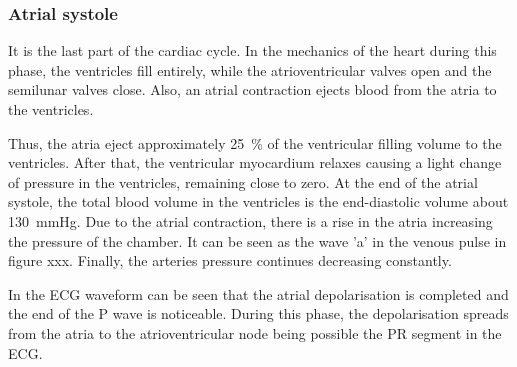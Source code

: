 \subsubsection{Atrial systole}
It is the last part of the cardiac cycle. In the mechanics of the heart during this phase, the ventricles fill entirely, while the atrioventricular valves open and the semilunar valves close. Also, an atrial contraction ejects blood from the atria to the ventricles. 

Thus, the atria eject approximately \SI{25}{\percent} of the ventricular filling volume to the ventricles. After that, the ventricular myocardium relaxes causing a light change of pressure in the ventricles, remaining close to zero. At the end of the atrial systole, the total blood volume in the ventricles is the end-diastolic volume about \SI{130}{\mmHg}. Due to the atrial contraction, there is a rise in the atria increasing the pressure of the chamber. It can be seen as the wave 'a' in the venous pulse in figure xxx. Finally, the arteries pressure continues decreasing constantly.

In the ECG waveform can be seen that the atrial depolarisation is completed and the end of the P wave is noticeable. During this phase, the depolarisation spreads from the atria to the atrioventricular node being possible the PR segment in the ECG.

